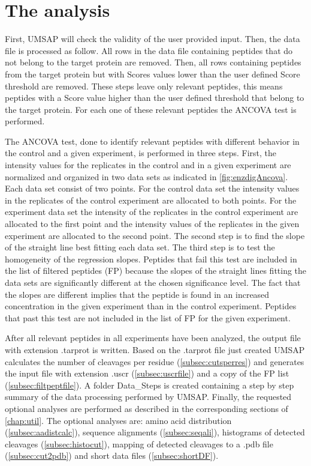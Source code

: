 \section{The analysis}

First, UMSAP will check the validity of the user provided input. Then, the data file is processed as follow. All rows in the data file containing peptides that do not belong to the target protein are removed. Then, all rows containing peptides from the target protein but with Scores values lower than the user defined Score threshold are removed. These steps leave only relevant peptides, this means peptides with a Score value higher than the user defined threshold that belong to the target protein. For each one of these relevant peptides the ANCOVA test is performed. 

The ANCOVA test, \label{par:ancovatest} done to identify relevant peptides with different behavior in the control and a given experiment, is performed in three steps. First, the intensity values for the replicates in the control and in a given experiment are normalized and organized in two data sets as indicated in \autoref{fig:enzdigAncova}. Each data set consist of two points. For the control data set the intensity values in the replicates of the control experiment are allocated to both points. For the experiment data set the intensity of the replicates in the control experiment are allocated to the first point and the intensity values of the replicates in the given experiment are allocated to the second point. The second step is to find the slope of the straight line best fitting each data set. The third step is to test the homogeneity of the regression slopes. Peptides that fail this test are included in the list of filtered peptides (FP) because the slopes of the straight lines fitting the data sets are significantly different at the chosen significance level. The fact that the slopes are different implies that the peptide is found in an increased concentration in the given experiment than in the control experiment. Peptides that past this test are not included in the list of FP for the given experiment. 

After all relevant peptides in all experiments have been analyzed, the output file with extension .tarprot is written. Based on the .tarprot file just created UMSAP calculates the number of cleavages per residue (\autoref{subsec:cutsperres}) and generates the input file with extension .uscr (\autoref{subsec:uscrfile}) and a copy of the FP list (\autoref{subsec:filtpeptfile}). A folder Data{\_}Steps is created containing a step by step summary of the data processing performed by UMSAP. Finally, the requested optional analyses are performed as described in the corresponding sections of \autoref{chap:util}. The optional analyses are: amino acid distribution (\autoref{subsec:aadistcalc}), sequence alignments (\autoref{subsec:seqali}), histograms of detected cleavages (\autoref{subsec:histocut}), mapping of detected cleavages to a .pdb file (\autoref{subsec:cut2pdb}) and short data files (\autoref{subsec:shortDF}).

